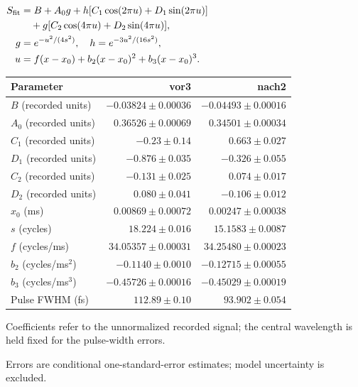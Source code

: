 \par\smallskip\begingroup\small
\setlength{\tabcolsep}{5pt}
\(\begin{aligned}S_{\rm fit}&=B+A_0g+h[C_1\cos(2\pi u)+D_1\sin(2\pi u)]\\&\quad+g[C_2\cos(4\pi u)+D_2\sin(4\pi u)],\\g&=e^{-u^2/(4s^2)},\quad h=e^{-3u^2/(16s^2)},\\u&=f(x-x_0)+b_2(x-x_0)^2+b_3(x-x_0)^3.\end{aligned}\)
\par\smallskip\begin{tabular}{lrr}\toprule
Parameter & vor3 & nach2\\\midrule
$B$ (recorded units) & $-0.03824\pm0.00036$ & $-0.04493\pm0.00016$\\
$A_0$ (recorded units) & $0.36526\pm0.00069$ & $0.34501\pm0.00034$\\
$C_1$ (recorded units) & $-0.23\pm0.14$ & $0.663\pm0.027$\\
$D_1$ (recorded units) & $-0.876\pm0.035$ & $-0.326\pm0.055$\\
$C_2$ (recorded units) & $-0.131\pm0.025$ & $0.074\pm0.017$\\
$D_2$ (recorded units) & $0.080\pm0.041$ & $-0.106\pm0.012$\\
$x_0$ (ms) & $0.00869\pm0.00072$ & $0.00247\pm0.00038$\\
$s$ (cycles) & $18.224\pm0.016$ & $15.1583\pm0.0087$\\
$f$ (cycles/ms) & $34.05357\pm0.00031$ & $34.25480\pm0.00023$\\
$b_2$ (cycles/ms$^2$) & $-0.1140\pm0.0010$ & $-0.12715\pm0.00055$\\
$b_3$ (cycles/ms$^3$) & $-0.45726\pm0.00016$ & $-0.45029\pm0.00019$\\
Pulse FWHM (fs) & $112.89\pm0.10$ & $93.902\pm0.054$\\
\bottomrule\end{tabular}
\par\smallskip\noindent Coefficients refer to the unnormalized recorded signal; the central wavelength is held fixed for the pulse-width errors.
\par\smallskip\noindent Errors are conditional one-standard-error estimates; model uncertainty is excluded.
\par\endgroup
